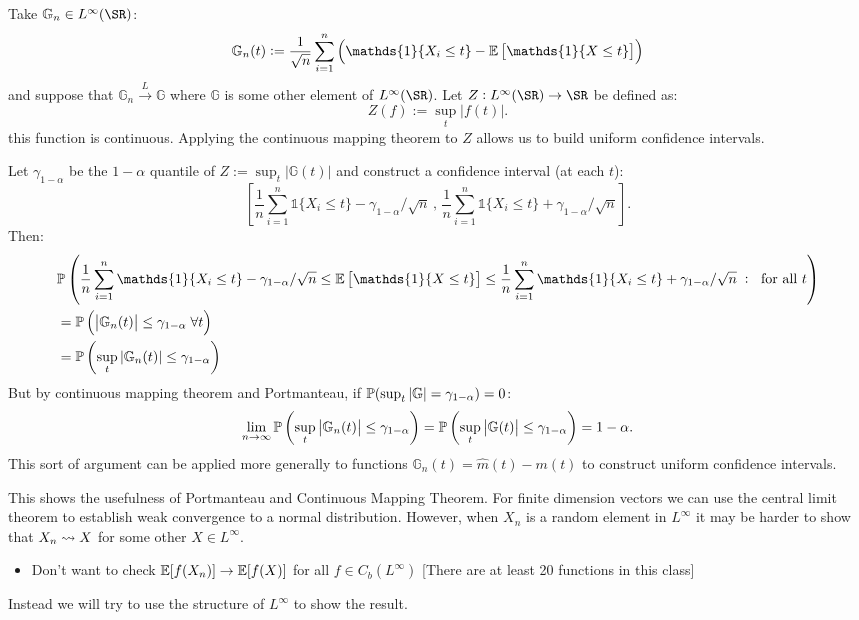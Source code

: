 \begin{example}[]
	\label{ex:uniform}
	Take \(\mathbb{G}_n \in L^\infty(\SR)\): 
	\[\mathbb{G}_n(t) := \frac{1}{\sqrt{n}}\sum_{i=1}^n\left( \mathds{1}\{X_i \leq t\} - \E\left[\mathds{1}\{X \leq t\}\right]\right)\]
	and suppose that \(\mathbb{G}_n \overset{L}{\to} \mathbb{G}\) where \(\mathbb{G}\) is some other element of  \(L^\infty(\SR)\). Let  \(Z: L^\infty(\SR) \to \SR\) be defined as:
	 \[
		 Z(f) := \sup_{t} |f(t)|
	.\]
	this function is continuous. Applying the continuous mapping theorem to \(Z\) allows us to build uniform confidence intervals. 

	Let \(\gamma_{1-\alpha}\) be the  \(1-\alpha\) quantile of  \(Z := \sup_t |\mathbb{G}(t)|\) and construct a confidence interval (at each \(t\)):
	\[
		\left[\frac{1}{n}\sum_{i=1}^n\mathds{1}\{X_i\leq t\}  -\gamma_{1-\alpha}/\sqrt{n}\,,\,\frac{1}{n}\sum_{i=1}^n\mathds{1}\{X_i\leq t\}+\gamma_{1-\alpha}/\sqrt{n}\right]
	.\]
	Then:
	\begin{align*}
		&\P\left(\frac{1}{n}\sum_{i=1}^n\mathds{1}\{X_i \leq t\}  -\gamma_{1-\alpha}/\sqrt{n} \leq \E\left[\mathds{1}\{X\leq t\}\right] \leq \frac{1}{n}\sum_{i=1}^n \mathds{1}\{X_i \leq t\} + \gamma_{1-\alpha} /\sqrt{n}\;:\;\text{ for all } t \right) \\
		&= \P\left(\left|\mathbb{G}_n(t)\right| \leq \gamma_{1-\alpha}\;\forall t\right) \\
		&= \P\left(\sup_t |\mathbb{G}_n(t)| \leq \gamma_{1-\alpha}\right)
	\end{align*}
	But by continuous mapping theorem and Portmanteau, if \(\P(\sup_t\left|\mathbb{G}\right|=\gamma_{1-\alpha}) = 0\):
	\[
		\lim_{n\to\infty}\P\left(\sup_t\left|\mathbb{G}_n(t)\right|\leq \gamma_{1-\alpha}\right) = \P\left(\sup_t \left|\mathbb{G}(t)\right|\leq \gamma_{1-\alpha}\right) = 1-\alpha
	.\]
	This sort of argument can be applied more generally to functions \(\mathbb{G}_n(t) = \hat{m}(t)-m(t)\) to construct uniform confidence intervals.
\end{example}

This shows the usefulness of Portmanteau and Continuous Mapping Theorem. For finite dimension vectors we can use the central limit theorem to establish weak convergence to a normal distribution. However, when \(X_n\) is a random element in  \(L^\infty\) it may be harder to show that \(X_n \wcov X\) for some other  \(X \in L^\infty\).
 \begin{itemize}
	 \item Don't want to check \(\E[f(X_n)] \to \E[f(X)]\) for all  \(f\in C_b(L^\infty)\) [There are at least 20 functions in this class]
\end{itemize}
Instead we will try to use the structure of \(L^\infty\) to show the result. 

